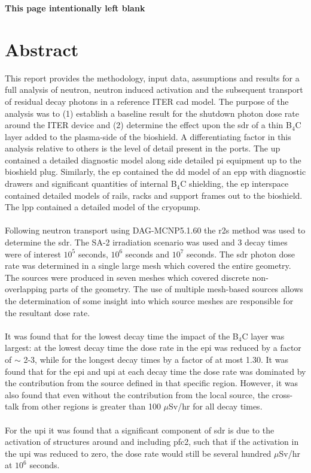 \documentclass[12pt]{article}
\newcommand*{\blankpage}{%
\vspace*{\fill}
\begin{center}
 \centering \textbf{This page intentionally left blank}
\end{center}
\vspace{\fill}}
\begin{document}
\newpage
\blankpage

\newpage
\section*{Abstract}

This report provides the methodology, input data, assumptions and results for a
full analysis of neutron, neutron induced activation and the subsequent
transport of residual decay photons in a reference ITER \gls{cad} model. The 
purpose of the analysis was to (1) establish a baseline result for the shutdown 
photon dose rate around the ITER device and (2) determine the effect upon the 
\gls{sdr} of a thin B$_4$C layer added to the plasma-side of the bioshield. A 
differentiating factor in this analysis relative to others is the level of 
detail present in the ports. The \gls{up} contained a detailed diagnostic model 
along side detailed \gls{pi} equipment up to the bioshield plug. Similarly, the 
\gls{ep} contained the \gls{dd} model of an \gls{epp} with diagnostic drawers 
and significant quantities of internal B$_4$C shielding, the \gls{ep} interspace
contained detailed models of rails, racks and support frames out to the 
bioshield. The \gls{lpp} contained a detailed model of the cryopump. 
\\
\\
Following neutron transport using DAG-MCNP5.1.60 the \gls{r2s} method was used 
to  determine the \gls{sdr}. The SA-2 irradiation scenario \cite{sa2_irradiation} was used and 3 decay
times were of interest $10^5$ seconds, $10^6$ seconds and 
$10^7$ seconds. The \gls{sdr} photon dose rate was determined in a 
single large mesh which covered the entire geometry. The sources were produced 
in seven meshes which covered discrete non-overlapping parts of the geometry. 
The use of multiple mesh-based sources allows the determination of some insight 
into which source meshes are responsible for the resultant dose rate.
\\
\\
It was found that for the lowest decay time the impact of the B$_4$C layer was 
largest: at the lowest decay time the dose rate in the \gls{epi} was reduced
by a factor of $\sim$ 2-3, while for the longest decay times by a factor of at 
most 1.30. It was found that for the \gls{epi} and \gls{upi} at each decay time 
the dose rate was dominated by the contribution from the source defined in that
specific region. However, it was also found that even without the contribution from
the local source, the cross-talk from other regions is greater than 100 
$\mu$Sv/hr for all decay times.
\\
\\
For the \gls{upi} it was found that a significant component of \gls{sdr} is due
to the activation of structures around and including \gls{pfc}2, such 
that if the activation in the \gls{upi} was reduced to zero, the dose rate would
still be several hundred $\mu$Sv/hr at $10^6$ seconds.
\end{document}
